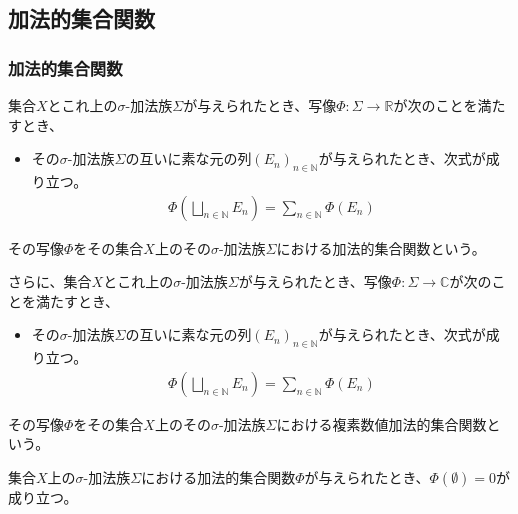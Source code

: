 \documentclass[dvipdfmx]{jsarticle}
\begin{document}
\subsection{加法的集合関数}%
\subsubsection{加法的集合関数}%
\begin{dfn}
集合$X$とこれ上の$\sigma$-加法族$\varSigma$が与えられたとき、写像$\varPhi:\varSigma \rightarrow \mathbb{R}$が次のことを満たすとき、
\begin{itemize}
\item
  その$\sigma$-加法族$\varSigma$の互いに素な元の列$\left( E_{n} \right)_{n \in \mathbb{N}}$が与えられたとき、次式が成り立つ。
\begin{align*}
\varPhi\left( \bigsqcup_{n \in \mathbb{N}} E_{n} \right) = \sum_{n \in \mathbb{N}} {\varPhi\left( E_{n} \right)}
\end{align*}
\end{itemize}
その写像$\varPhi$をその集合$X$上のその$\sigma$-加法族$\varSigma$における加法的集合関数という。\par
さらに、集合$X$とこれ上の$\sigma$-加法族$\varSigma$が与えられたとき、写像$\varPhi:\varSigma \rightarrow \mathbb{C}$が次のことを満たすとき、
\begin{itemize}
\item
  その$\sigma$-加法族$\varSigma$の互いに素な元の列$\left( E_{n} \right)_{n \in \mathbb{N}}$が与えられたとき、次式が成り立つ。
\begin{align*}
\varPhi\left( \bigsqcup_{n \in \mathbb{N}} E_{n} \right) = \sum_{n \in \mathbb{N}} {\varPhi\left( E_{n} \right)}
\end{align*}
\end{itemize}
その写像$\varPhi$をその集合$X$上のその$\sigma$-加法族$\varSigma$における複素数値加法的集合関数という。
\end{dfn}
\begin{thm}\label{4.6.7.1}
集合$X$上の$\sigma$-加法族$\varSigma$における加法的集合関数$\varPhi$が与えられたとき、$\varPhi(\emptyset) = 0$が成り立つ。
\end{thm}
\end{document}
